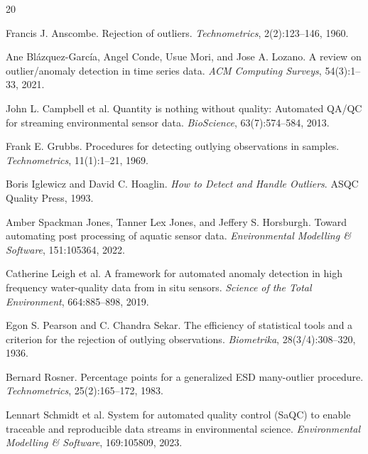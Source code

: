 \clearpage
\begin{thebibliography}{20}

Francis J. Anscombe.
\newblock Rejection of outliers.
\newblock \emph{Technometrics}, 2(2):123--146, 1960.

Ane Bl{\'a}zquez-Garc{\'i}a, Angel Conde, Usue Mori, and Jose A. Lozano.
\newblock A review on outlier/anomaly detection in time series data.
\newblock \emph{ACM Computing Surveys}, 54(3):1--33, 2021.

John L. Campbell et al.
\newblock Quantity is nothing without quality: Automated QA/QC for streaming environmental sensor data.
\newblock \emph{BioScience}, 63(7):574--584, 2013.

Frank E. Grubbs.
\newblock Procedures for detecting outlying observations in samples.
\newblock \emph{Technometrics}, 11(1):1--21, 1969.

Boris Iglewicz and David C. Hoaglin.
\newblock \emph{How to Detect and Handle Outliers}.
\newblock ASQC Quality Press, 1993.

Amber Spackman Jones, Tanner Lex Jones, and Jeffery S. Horsburgh.
\newblock Toward automating post processing of aquatic sensor data.
\newblock \emph{Environmental Modelling \& Software}, 151:105364, 2022.

Catherine Leigh et al.
\newblock A framework for automated anomaly detection in high frequency water-quality data from in situ sensors.
\newblock \emph{Science of the Total Environment}, 664:885--898, 2019.

Egon S. Pearson and C. Chandra Sekar.
\newblock The efficiency of statistical tools and a criterion for the rejection of outlying observations.
\newblock \emph{Biometrika}, 28(3/4):308--320, 1936.

Bernard Rosner.
\newblock Percentage points for a generalized ESD many-outlier procedure.
\newblock \emph{Technometrics}, 25(2):165--172, 1983.

Lennart Schmidt et al.
\newblock System for automated quality control (SaQC) to enable traceable and reproducible data streams in environmental science.
\newblock \emph{Environmental Modelling \& Software}, 169:105809, 2023.


\end{thebibliography}
